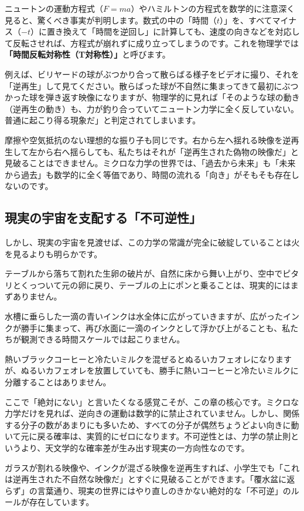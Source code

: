 ニュートンの運動方程式（\(F=ma\)）やハミルトンの方程式を数学的に注意深く見ると、驚くべき事実が判明します。数式の中の「時間（\(t\)）」を、すべてマイナス（\(-t\)）に置き換えて「時間を逆回し」に計算しても、速度の向きなどを対応して反転させれば、方程式が崩れずに成り立ってしまうのです。これを物理学では\textbf{「時間反転対称性（T対称性）」}と呼びます。

例えば、ビリヤードの球がぶつかり合って散らばる様子をビデオに撮り、それを「逆再生」して見てください。散らばった球が不自然に集まってきて最初にぶつかった球を弾き返す映像になりますが、物理学的に見れば「そのような球の動き（逆再生の動き）も、力が釣り合っていてニュートン力学に全く反していない。普通に起こり得る現象だ」と判定されてしまいます。

摩擦や空気抵抗のない理想的な振り子も同じです。右から左へ揺れる映像を逆再生して左から右へ揺らしても、私たちはそれが「逆再生された偽物の映像だ」と見破ることはできません。ミクロな力学の世界では、「過去から未来」も「未来から過去」も数学的に全く等価であり、時間の流れる「向き」がそもそも存在しないのです。

\subsection{現実の宇宙を支配する「不可逆性」}

しかし、現実の宇宙を見渡せば、この力学の常識が完全に破綻していることは火を見るよりも明らかです。

テーブルから落ちて割れた生卵の破片が、自然に床から舞い上がり、空中でピタリとくっついて元の卵に戻り、テーブルの上にポンと乗ることは、現実的にはまずありません。

水槽に垂らした一滴の青いインクは水全体に広がっていきますが、広がったインクが勝手に集まって、再び水面に一滴のインクとして浮かび上がることも、私たちが観測できる時間スケールでは起こりません。

熱いブラックコーヒーと冷たいミルクを混ぜるとぬるいカフェオレになりますが、ぬるいカフェオレを放置していても、勝手に熱いコーヒーと冷たいミルクに分離することはありません。

ここで「絶対にない」と言いたくなる感覚こそが、この章の核心です。ミクロな力学だけを見れば、逆向きの運動は数学的に禁止されていません。しかし、関係する分子の数があまりにも多いため、すべての分子が偶然ちょうどよい向きに動いて元に戻る確率は、実質的にゼロになります。不可逆性とは、力学の禁止則というより、天文学的な確率差が生み出す現実の一方向性なのです。

ガラスが割れる映像や、インクが混ざる映像を逆再生すれば、小学生でも「これは逆再生された不自然な映像だ」とすぐに見破ることができます。「覆水盆に返らず」の言葉通り、現実の世界にはやり直しのきかない絶対的な「不可逆」のルールが存在しています。

